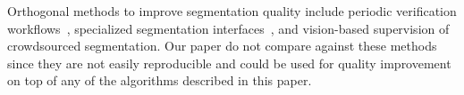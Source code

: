 Orthogonal methods to improve segmentation quality include periodic verification workflows~\cite{Lin2014,Everingham15}, specialized segmentation interfaces~\cite{Song2018}, and vision-based supervision of crowdsourced segmentation\cite{Russakovsky2015,Gurari2016}. Our paper do not compare against these methods since they are not easily reproducible and could be used for quality improvement on top of any of the algorithms described in this paper.  %


